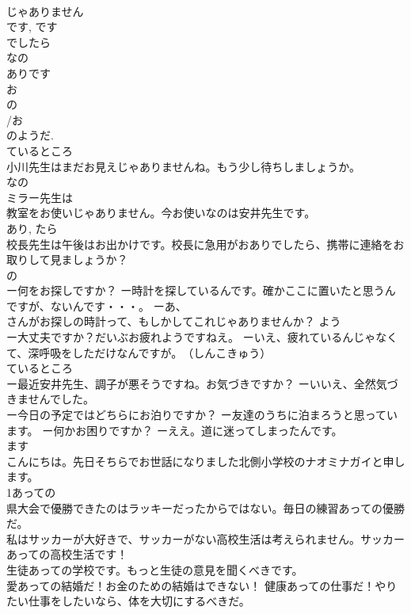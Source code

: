 \documentclass[8pt]{extreport}
\begin{document}
\begin{CJK}{UTF8}{min}
\\	じゃありません 
\\	です, です 
\\	でしたら 
\\	なの 
\\	ありです 
\\	お
\\	の
\\	/お
\\	のようだ. 
\\	ているところ 
\\	小川先生はまだお見えじゃありませんね。もう少し待ちしましょうか。 
\\	なの 
\\	ミラー先生は
\\	教室をお使いじゃありません。今お使いなのは安井先生です。 
\\	あり, たら 
\\	校長先生は午後はお出かけです。校長に急用がおありでしたら、携帯に連絡をお取りして見ましょうか？ 
\\	の
\\	ー何をお探しですか？ ー時計を探しているんです。確かここに置いたと思うんですが、ないんです・・・。 ーあ、
\\	さんがお探しの時計って、もしかしてこれじゃありませんか？ よう 
\\	ー大丈夫ですか？だいぶお疲れようですねえ。 ーいえ、疲れているんじゃなくて、深呼吸をしただけなんですが。　（しんこきゅう） 
\\	ているところ 
\\	ー最近安井先生、調子が悪そうですね。お気づきですか？ ーいいえ、全然気づきませんでした。 
\\	ー今日の予定ではどちらにお泊りですか？ ー友達のうちに泊まろうと思っています。 ー何かお困りですか？ ーええ。道に迷ってしまったんです。 
\\	ます
\\	こんにちは。先日そちらでお世話になりました北側小学校のナオミナガイと申します。 
\\	1あっての
\\	県大会で優勝できたのはラッキーだったからではない。毎日の練習あっての優勝だ。 
\\	私はサッカーが大好きで、サッカーがない高校生活は考えられません。サッカーあっての高校生活です！ 
\\	生徒あっての学校です。もっと生徒の意見を聞くべきです。 
\\	愛あっての結婚だ！お金のための結婚はできない！ 健康あっての仕事だ！やりたい仕事をしたいなら、体を大切にするべきだ。 

\end{CJK}
\end{document}

